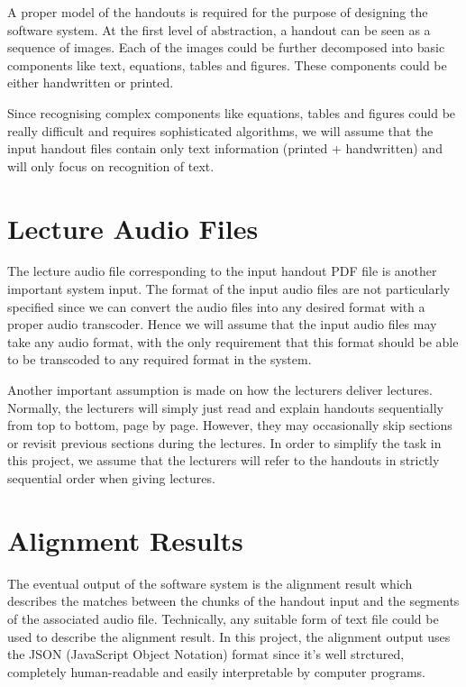 A proper model of the handouts is required for the purpose of designing the software system. At the first level of abstraction, a handout can be seen as a sequence of images. Each of the images could be further decomposed into basic components like text, equations, tables and figures. These components could be either handwritten or printed.

Since recognising complex components like equations, tables and figures could be really difficult and requires sophisticated algorithms, we will assume that the input handout files contain only text information (printed + handwritten) and will only focus on recognition of text.


\section{Lecture Audio Files}

The lecture audio file corresponding to the input handout PDF file is another important system input. The format of the input audio files are not particularly specified since we can convert the audio files into any desired format with a proper audio transcoder. Hence we will assume that the input audio files may take any audio format, with the only requirement that this format should be able to be transcoded to any required format in the system.

Another important assumption is made on how the lecturers deliver lectures. Normally, the lecturers will simply just read and explain handouts sequentially from top to bottom, page by page. However, they may occasionally skip sections or revisit previous sections during the lectures. In order to simplify the task in this project, we assume that the lecturers will refer to the handouts in strictly sequential order when giving lectures.


\section{Alignment Results}

The eventual output of the software system is the alignment result which describes the matches between the chunks of the handout input and the segments of the associated audio file. Technically, any suitable form of text file could be used to describe the alignment result. In this project, the alignment output uses the JSON (JavaScript Object Notation) format since it's well strctured, completely human-readable and easily interpretable by computer programs.

